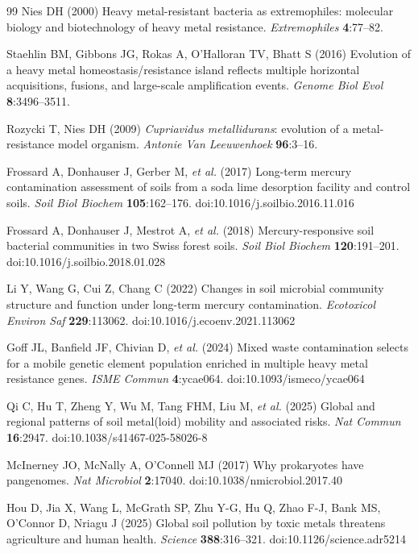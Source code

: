 \documentclass[times]{zHenriquesLab-StyleBioRxiv}
\begin{document}
\begin{thebibliography}{99}
Nies DH (2000) Heavy metal-resistant bacteria as extremophiles: molecular
biology and biotechnology of heavy metal resistance. \textit{Extremophiles}
\textbf{4}:77--82.

Staehlin BM, Gibbons JG, Rokas A, O'Halloran TV, Bhatt S (2016) Evolution of a
heavy metal homeostasis/resistance island reflects multiple horizontal
acquisitions, fusions, and large-scale amplification events. \textit{Genome Biol
Evol} \textbf{8}:3496--3511.

Rozycki T, Nies DH (2009) \textit{Cupriavidus metallidurans}: evolution of a
metal-resistance model organism. \textit{Antonie Van Leeuwenhoek}
\textbf{96}:3--16.

Frossard A, Donhauser J, Gerber M, \textit{et al.} (2017) Long-term mercury
contamination assessment of soils from a soda lime desorption facility and
control soils. \textit{Soil Biol Biochem} \textbf{105}:162--176.
doi:10.1016/j.soilbio.2016.11.016

Frossard A, Donhauser J, Mestrot A, \textit{et al.} (2018) Mercury-responsive
soil bacterial communities in two Swiss forest soils. \textit{Soil Biol Biochem}
\textbf{120}:191--201. doi:10.1016/j.soilbio.2018.01.028

Li Y, Wang G, Cui Z, Chang C (2022) Changes in soil microbial community
structure and function under long-term mercury contamination.
\textit{Ecotoxicol Environ Saf} \textbf{229}:113062.
doi:10.1016/j.ecoenv.2021.113062

Goff JL, Banfield JF, Chivian D, \textit{et al.} (2024) Mixed waste
contamination selects for a mobile genetic element population enriched in
multiple heavy metal resistance genes. \textit{ISME Commun} \textbf{4}:ycae064.
doi:10.1093/ismeco/ycae064

Qi C, Hu T, Zheng Y, Wu M, Tang FHM, Liu M, \textit{et al.} (2025) Global
and regional patterns of soil metal(loid) mobility and associated risks.
\textit{Nat Commun} \textbf{16}:2947. doi:10.1038/s41467-025-58026-8

McInerney JO, McNally A, O'Connell MJ (2017) Why prokaryotes have pangenomes.
\textit{Nat Microbiol} \textbf{2}:17040. doi:10.1038/nmicrobiol.2017.40

Hou D, Jia X, Wang L, McGrath SP, Zhu Y-G, Hu Q, Zhao F-J, Bank MS, O'Connor D,
Nriagu J (2025) Global soil pollution by toxic metals threatens agriculture and
human health. \textit{Science} \textbf{388}:316--321. doi:10.1126/science.adr5214


\end{thebibliography}
\end{document}
